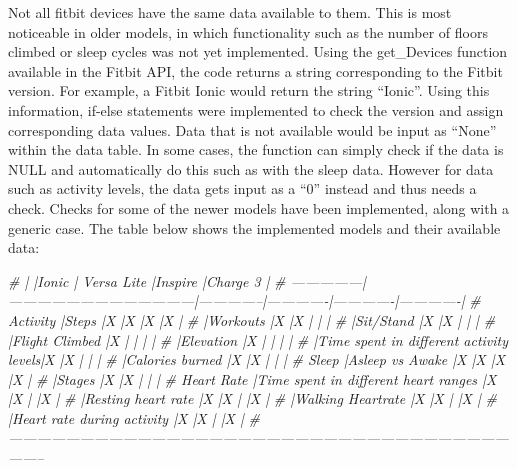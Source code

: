 \documentclass[]{book}
\newenvironment{Shaded}{\begin{snugshade}}{\end{snugshade}}
\newcommand{\CommentTok}[1]{\textcolor[rgb]{0.56,0.35,0.01}{\textit{#1}}}
\begin{document}
Not all fitbit devices have the same data available to them. This is
most noticeable in older models, in which functionality such as the
number of floors climbed or sleep cycles was not yet implemented. Using
the get\_Devices function available in the Fitbit API, the code returns
a string corresponding to the Fitbit version. For example, a Fitbit
Ionic would return the string ``Ionic''. Using this information, if-else
statements were implemented to check the version and assign
corresponding data values. Data that is not available would be input as
``None'' within the data table. In some cases, the function can simply
check if the data is NULL and automatically do this such as with the
sleep data. However for data such as activity levels, the data gets
input as a ``0'' instead and thus needs a check. Checks for some of the
newer models have been implemented, along with a generic case. The table
below shows the implemented models and their available data:

\begin{Shaded}
\begin{Highlighting}[]
 \CommentTok{#                |                                       |Ionic         | Versa Lite  |Inspire      |Charge 3     |}
 \CommentTok{# ---------------|---------------------------------------|--------------|-------------|-------------|-------------|}
 \CommentTok{# Activity       |Steps                                  |X             |X            |X            |X            |}
 \CommentTok{#                |Workouts                               |X             |X            |             |             |}
 \CommentTok{#                |Sit/Stand                              |X             |X            |             |             |}
 \CommentTok{#                |Flight Climbed                         |X             |             |             |             |}
 \CommentTok{#                |Elevation                              |X             |             |             |             |}
 \CommentTok{#                |Time spent in different activity levels|X             |X            |             |             |}
 \CommentTok{#                |Calories burned                        |X             |X            |             |             |}
 \CommentTok{# Sleep          |Asleep vs Awake                        |X             |X            |X            |X            |}
 \CommentTok{#                |Stages                                 |X             |X            |             |             |}
 \CommentTok{# Heart Rate     |Time spent in different heart ranges   |X             |X            |             |X            |}
 \CommentTok{#                |Resting heart rate                     |X             |X            |             |X            |}
 \CommentTok{#                |Walking Heartrate                      |X             |X            |             |X            |}
 \CommentTok{#                |Heart rate during activity             |X             |X            |             |X            |}
 \CommentTok{# -----------------------------------------------------------------------------------------------------------------}
\end{Highlighting}
\end{Shaded}
\end{document}
